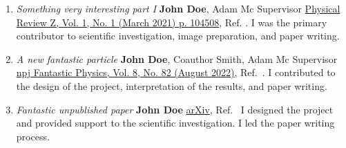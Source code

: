 \documentclass[../main]{subfiles}
\begin{document}
\begin{enumerate}
    \item \textit{Something very interesting part I} \newline 
         \textbf{John Doe}, Adam Mc Supervisor 
         \newline
        \href{https://doi.org/10.1103/DOI}{Physical Review Z, Vol. 1, No. 1 (March 2021) p. 104508}, Ref. \cite{Doe_PRB_2021}. \newline
        I was the primary contributor to scientific investigation, image preparation, and paper writing.
        \\
    \item \textit{A new fantastic particle} \newline
         \textbf{John Doe}, Coauthor Smith, Adam Mc Supervisor \newline 
        \href{https://doi.org/10.1038/DOI}{npj Fantastic Physics, Vol. 8, No. 82 (August 2022)},  Ref.~\cite{Doe_npjFP_2022}.\newline
        I contributed to the design of the project, interpretation of the results, and paper writing. 
        \\
        \item \textit{Fantastic unpublished paper} \newline
        \textbf{John Doe} \newline        
        \href{arxiv_link}{arXiv}, Ref.~\cite{Doe_2023}  \newline
        I designed the project and provided support to the scientific investigation. I led the paper writing process. 
        \\
\end{enumerate}


\ifSubfilesClassLoaded{%
\printbibliography
}{}
\end{document}

